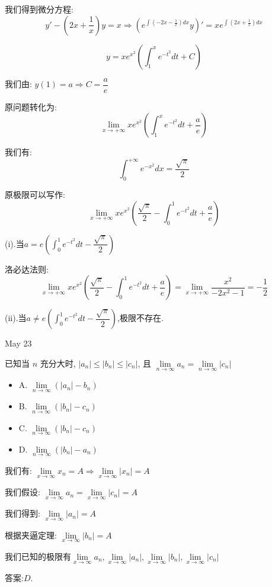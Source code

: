 \begin{solution}
	
	我们得到微分方程: 
	$$y'-(2x+\frac{1}{x})y=x\Rightarrow (e^{\int (-2x-\frac{1}{x})dx}y)'=xe^{\int (2x+\frac{1}{x})dx}$$
	
	$$y=xe^{x^2}(\int_{1}^{x}e^{-t^2}dt+C)$$
	
	我们由: $y(1)=a\Rightarrow C=\dfrac{a}{e}$
	
	原问题转化为: 
	$$\lim\limits_{x\to +\infty}xe^{x^2}(\int_{1}^{x}e^{-t^2}dt+\frac{a}{e})$$
	
	我们有: $$\int_{0}^{+\infty}e^{-x^2}dx=\frac{\sqrt{\pi}}{2}$$
	
	原极限可以写作: 
	$$\lim\limits_{x\to +\infty}xe^{x^2}(\frac{\sqrt{\pi}}{2}-\int_{0}^{1}e^{-t^2}dt+\frac{a}{e})$$
	
	(i).当$a=e(\int_{0}^{1}e^{-t^2}dt-\dfrac{\sqrt{\pi}}{2})$
	
	洛必达法则: $$\lim\limits_{x\to +\infty}xe^{x^2}(\frac{\sqrt{\pi}}{2}-\int_{0}^{1}e^{-t^2}dt+\frac{a}{e})=\lim\limits_{x\to +\infty}\frac{x^2}{-2x^2-1}=-\frac{1}{2}$$
	
	(ii).当$a\neq e(\int_{0}^{1}e^{-t^2}dt-\dfrac{\sqrt{\pi}}{2})$,极限不存在.
\end{solution}


\textcolor{purplea}{May 23}

\begin{example}[][Exam: 31.4.3]
	已知当 $n$ 充分大时, $|a_{n}|\leq |b_{n}|\leq |c_{n}|$, 且 $\lim\limits_{n\to \infty}a_{n}=\lim\limits_{n\to \infty}|c_{n}|$ 
\begin{itemize}
	\item A. $\lim\limits_{n\to \infty}(|a_{n}|-b_{n})$
	\item B. $\lim\limits_{n\to \infty}(|b_{n}|-c_{n})$
	\item C. $\lim\limits_{n\to \infty}(|b_{n}|-c_{n})$
	\item D. $\lim\limits_{n\to \infty}(|b_{n}|-a_{n})$
\end{itemize}
\end{example}

\begin{solution}
	
	我们有: $\lim\limits_{x\to \infty}x_{n}=A\Rightarrow \lim\limits_{x\to \infty}|x_{n}|=A$
	
	我们假设: $\lim\limits_{x\to \infty}a_{n}=\lim\limits_{x\to \infty}|c_{n}|=A$
	
	我们得到: $\lim\limits_{x\to \infty}|a_{n}|=A$
	
	根据夹逼定理: $\lim\limits_{x\to \infty}|b_{n}|=A$
	
	我们已知的极限有$\lim\limits_{x\to \infty}a_{n},\lim\limits_{x\to \infty}|a_{n}|,\lim\limits_{x\to \infty}|b_{n}|,\lim\limits_{x\to \infty}|c_{n}|$
	
	答案:$D$.
\end{solution}

